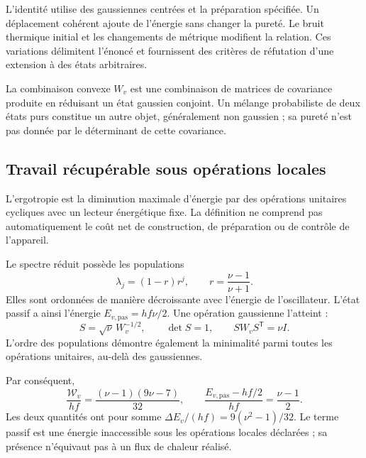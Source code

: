L’identité utilise des gaussiennes centrées et la préparation
spécifiée. Un déplacement cohérent ajoute de l’énergie sans
changer la pureté. Le bruit thermique initial et les changements de
métrique modifient la relation. Ces variations délimitent
l’énoncé et fournissent des critères de réfutation d’une extension à des états
arbitraires.

La combinaison convexe $W_v$ est une combinaison de matrices
de covariance produite en réduisant un état gaussien conjoint.
Un mélange probabiliste de deux états purs constitue
un autre objet, généralement non gaussien ; sa pureté n’est pas
donnée par le déterminant de cette covariance.

\subsection{Travail récupérable sous opérations locales}
\label{md:aux:ergotropia}

L’ergotropie est la diminution maximale d’énergie par des
opérations unitaires cycliques avec un lecteur énergétique fixe.
La définition ne comprend pas automatiquement le coût net de
construction, de préparation ou de contrôle de l’appareil.

Le spectre réduit possède les populations
\begin{equation}
 \lambda_j=(1-r)r^j,\qquad r=\frac{\nu-1}{\nu+1}.
 \label{md:aux:espectro-gaussiano}
\end{equation}
Elles sont ordonnées de manière décroissante avec l’énergie de l’oscillateur.
L’état passif a ainsi l’énergie $E_{v,\mathrm{pas}}=hf\nu/2$.
Une opération gaussienne l’atteint :
\begin{equation}
 S=\sqrt\nu\,W_v^{-1/2},\qquad
 \det S=1,\qquad SW_vS^{\mathsf T}=\nu I.
 \label{md:aux:pasivacion}
\end{equation}
L’ordre des populations démontre également la minimalité
parmi toutes les opérations unitaires, au-delà des gaussiennes.

Par conséquent,
\begin{equation}
 \boxed{
 \frac{\mathcal W_v}{hf}
 =\frac{(\nu-1)(9\nu-7)}{32},\qquad
 \frac{E_{v,\mathrm{pas}}-hf/2}{hf}=\frac{\nu-1}{2}.}
 \label{md:aux:trabajo-visible}
\end{equation}
Les deux quantités ont pour somme
$\Delta E_v/(hf)=9(\nu^2-1)/32$. Le terme passif est une
énergie inaccessible sous les opérations locales déclarées ;
sa présence n’équivaut pas à un flux de chaleur réalisé.

